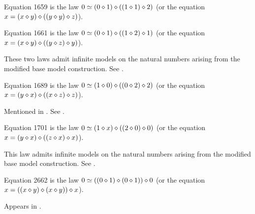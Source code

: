 \begin{definition}[Equation 1659]\label{eq1659}\leanok{}  Equation 1659 is the law $0 \simeq  (0 \diamond 1) \diamond ((1 \diamond 1) \diamond 2)$ (or the equation $x = (x \diamond y) \diamond ((y \diamond y) \diamond z)$).
\end{definition}

\begin{definition}[Equation 1661]\label{eq1661}\leanok{}  Equation 1661 is the law $0 \simeq  (0 \diamond 1) \diamond ((1 \diamond 2) \diamond 1)$ (or the equation $x = (x \diamond y) \diamond ((y \diamond z) \diamond y)$).
\end{definition}

These two laws admit infinite models on the natural numbers arising from the modified base model construction. See .

\begin{definition}[Equation 1689]\label{eq1689}\leanok{}  Equation 1689 is the law $0 \simeq  (1 \diamond 0) \diamond ((0 \diamond 2) \diamond 2)$ (or the equation $x = (y \diamond x) \diamond ((x \diamond z) \diamond z)$).
\end{definition}

Mentioned in \cite{Kisielewicz2}.  See .

\begin{definition}[Equation 1701]\label{eq1701}\leanok{}  Equation 1701 is the law $0 \simeq  (1 \diamond x) \diamond ((2 \diamond 0) \diamond 0)$ (or the equation $x = (y \diamond x) \diamond ((z \diamond x) \diamond x)$).
\end{definition}

This law admits infinite models on the natural numbers arising from the modified base model construction. See .

\begin{definition}[Equation 2662]\label{eq2662}\leanok{}  Equation 2662 is the law $0 \simeq  ((0 \diamond 1) \diamond (0 \diamond 1)) \diamond 0$ (or the equation $x = ((x \diamond y) \diamond (x \diamond y)) \diamond x$).
\end{definition}

Appears in \cite{mendelsohn-padmanabhan}.

